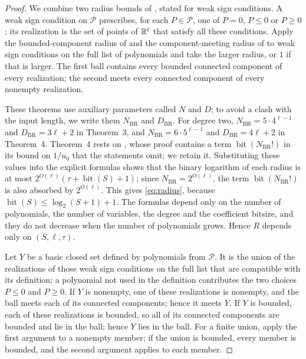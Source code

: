 \begin{proof}
We combine two radius bounds of \citet{BasuRoy2010}, stated for weak
sign conditions. A weak sign condition on $\mathcal P$ prescribes, for
each $P\in\mathcal P$, one of $P=0$, $P\le0$ or $P\ge0$; its
realization is the set of points of $\mathbb R^\ell$ that satisfy all these
conditions. Apply the bounded-component radius of
\citet[Theorem~3]{BasuRoy2010} and the component-meeting radius of
\citet[Theorem~4]{BasuRoy2010} to weak sign conditions on the full list
of polynomials and take the larger radius, or $1$ if that is larger.
The first ball contains every bounded connected component of every
realization; the second meets every connected component of every
nonempty realization.

These theorems use auxiliary parameters called $N$ and $D$; to avoid a
clash with the input length, we write them $N_{\mathrm{BR}}$ and
$D_{\mathrm{BR}}$. For degree two, $N_{\mathrm{BR}}=5\cdot4^{\ell-1}$ and
$D_{\mathrm{BR}}=3\ell+2$ in Theorem~3, and
$N_{\mathrm{BR}}=6\cdot5^{\ell-1}$ and $D_{\mathrm{BR}}=4\ell+2$ in
Theorem~4. Theorem~4 rests on \citet[Theorem~2]{BasuRoy2010}, whose proof
contains a term $\operatorname{bit}(N_{\mathrm{BR}}!)$ in its bound on
$1/u_0$ that the statements omit; we retain it. Substituting these values
into the explicit formulas shows that the binary logarithm of each radius
is at most $2^{O(\ell)}(\tau+\operatorname{bit}(S)+1)$; since
$N_{\mathrm{BR}}=2^{O(\ell)}$, the term
$\operatorname{bit}(N_{\mathrm{BR}}!)$ is also absorbed by
$2^{O(\ell)}$. This gives \eqref{eq:radius}, because
$\operatorname{bit}(S)\le\log_2(S+1)+1$. The formulas depend only on the
number of polynomials, the number of variables, the degree and the
coefficient bitsize, and they do not decrease when the number of
polynomials grows. Hence $R$ depends only on $(S,\ell,\tau)$.

Let $Y$ be a basic closed set defined by polynomials from $\mathcal P$.
It is the union of the realizations of those weak sign conditions on the
full list that are compatible with its definition; a polynomial not used
in the definition contributes the two choices $P\le0$ and $P\ge0$. If
$Y$ is nonempty, one of these realizations is nonempty, and the ball
meets each of its connected components; hence it meets $Y$. If $Y$ is
bounded, each of these realizations is bounded, so all of its connected
components are bounded and lie in the ball; hence $Y$ lies in the ball.
For a finite union, apply the first argument to a nonempty member; if the
union is bounded, every member is bounded, and the second argument
applies to each member.
\end{proof}

